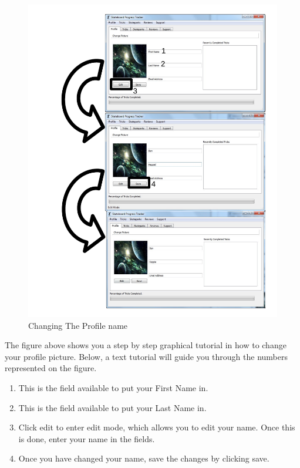 \begin{figure}[H]
    \includegraphics[width=\textwidth]{./Manual/Images/ChangeName.pdf}
    \caption{Changing The Profile name} \label{fig:Change Name}
\end{figure}

The figure above shows you a step by step graphical tutorial in how to change your profile picture. Below, a text tutorial will guide you through the numbers represented on the figure.

\begin{enumerate}
\item This is the field available to put your First Name in.
\item This is the field available to put your Last Name in.
\item Click edit to enter edit mode, which allows you to edit your name. Once this is done, enter your name in the fields.
\item Once you have changed your name, save the changes by clicking save.
\end{enumerate}

